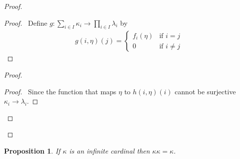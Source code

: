 \documentclass{report}
\let\qed\relax
\newtheorem{prop}[ax]{Proposition}
\theoremstyle{definition}
\begin{document}
\begin{proof}
\pf
{}
\begin{proof}
	\pf\ Define $g : \sum_{i \in I} \kappa_i \rightarrow \prod_{i \in I} \lambda_i$ by
	\begin{align*}
		g(i,\eta)(j) = \begin{cases}
		f_i(\eta) & \text{if } i = j \\
		0 & \text{if } i \neq j
		\end{cases}
	\end{align*}
\end{proof}
\begin{proof}
	\begin{proof}
		\pf\ Since the function that maps $\eta$ to $h(i,\eta)(i)$ cannot be surjective $\kappa_i \rightarrow \lambda_i$.
	\end{proof}
\end{proof}
\qed
\end{proof}

\begin{prop}
If $\kappa$ is an infinite cardinal then $\kappa \kappa = \kappa$.
\end{prop}
\end{document}
